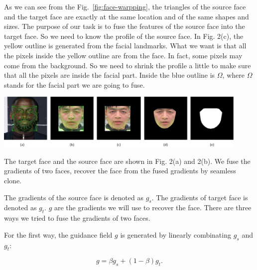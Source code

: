 As we can see from the Fig.~\ref{fig:face-warpping}, the triangles of the source face and the target face are exactly at the same location and of the same shapes and sizes. The purpose of our task is to fuse the features of the source face into the target face. So we need to know the profile of the source face. In Fig. 2(c), the yellow outline is generated from the facial landmarks. What we want is that all the pixels inside the yellow outline are from the face. In fact, some pixels may come from the background. So we need to shrink the profile a little to make sure that all the pixels are inside the facial part. Inside the blue outline is $\Omega$, where $\Omega$ stands for the facial part we are going to fuse.



\begin{center}
    \includegraphics[width=4.8in]{images/extract.png}
    \label{fig:face-warpping} 
\end{center}

The target face and the source face are shown in Fig. 2(a) and 2(b). We fuse the gradients of two faces, recover the face from the fused gradients by seamless clone.

The gradients of the source face is denoted as $g_s$. The gradients of target face is denoted as $g_t$. $g$ are the gradients we will use to recover the face. There are three ways we tried to fuse the gradients of two faces.
 

For the first way, the guidance field $g$ is generated  by linearly combinating $g_s$ and $g_t$:

\begin{equation}
\label{eq:gradient-linear}
g = \beta g_s+(1-\beta) g_t.
\end{equation}

